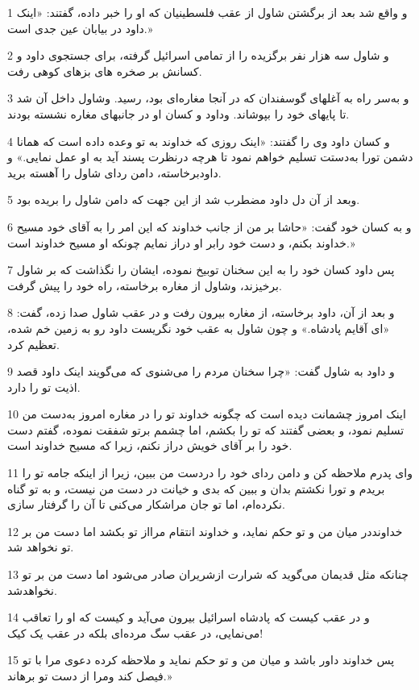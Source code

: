 \par 1 و واقع شد بعد از برگشتن شاول از عقب فلسطینیان که او را خبر داده، گفتند: «اینک داود در بیابان عین جدی است.»
\par 2 و شاول سه هزار نفر برگزیده را از تمامی اسرائیل گرفته، برای جستجوی داود و کسانش بر صخره های بزهای کوهی رفت.
\par 3 و به‌سر راه به آغلهای گوسفندان که در آنجا مغاره‌ای بود، رسید. وشاول داخل آن شد تا پایهای خود را بپوشاند. وداود و کسان او در جانبهای مغاره نشسته بودند.
\par 4 و کسان داود وی را گفتند: «اینک روزی که خداوند به تو وعده داده است که همانا دشمن تورا به‌دستت تسلیم خواهم نمود تا هر‌چه درنظرت پسند آید به او عمل نمایی.» و داودبرخاسته، دامن ردای شاول را آهسته برید.
\par 5 وبعد از آن دل داود مضطرب شد از این جهت که دامن شاول را بریده بود.
\par 6 و به کسان خود گفت: «حاشا بر من از جانب خداوند که این امر را به آقای خود مسیح خداوند بکنم، و دست خود رابر او دراز نمایم چونکه او مسیح خداوند است.»
\par 7 پس داود کسان خود را به این سخنان توبیخ نموده، ایشان را نگذاشت که بر شاول برخیزند، وشاول از مغاره برخاسته، راه خود را پیش گرفت.
\par 8 و بعد از آن، داود برخاسته، از مغاره بیرون رفت و در عقب شاول صدا زده، گفت: «ای آقایم پادشاه.» و چون شاول به عقب خود نگریست داود رو به زمین خم شده، تعظیم کرد.
\par 9 و داود به شاول گفت: «چرا سخنان مردم را می‌شنوی که می‌گویند اینک داود قصد اذیت تو را دارد.
\par 10 اینک امروز چشمانت دیده است که چگونه خداوند تو را در مغاره امروز به‌دست من تسلیم نمود، و بعضی گفتند که تو را بکشم، اما چشمم برتو شفقت نموده، گفتم دست خود را بر آقای خویش دراز نکنم، زیرا که مسیح خداوند است.
\par 11 و‌ای پدرم ملاحظه کن و دامن ردای خود را دردست من ببین، زیرا از اینکه جامه تو را بریدم و تورا نکشتم بدان و ببین که بدی و خیانت در دست من نیست، و به تو گناه نکرده‌ام، اما تو جان مراشکار می‌کنی تا آن را گرفتار سازی.
\par 12 خداونددر میان من و تو حکم نماید، و خداوند انتقام مرااز تو بکشد اما دست من بر تو نخواهد شد.
\par 13 چنانکه مثل قدیمان می‌گوید که شرارت ازشریران صادر می‌شود اما دست من بر تو نخواهدشد.
\par 14 و در عقب کیست که پادشاه اسرائیل بیرون می‌آید و کیست که او را تعاقب می‌نمایی، در عقب سگ مرده‌ای بلکه در عقب یک کیک!
\par 15 پس خداوند داور باشد و میان من و تو حکم نماید و ملاحظه کرده دعوی مرا با تو فیصل کند ومرا از دست تو برهاند.»
